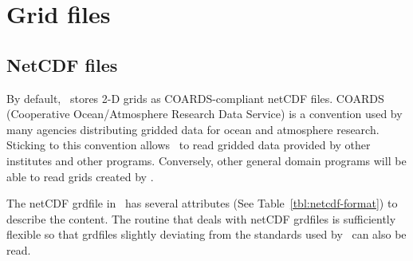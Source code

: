 \section{Grid files} 

\subsection{NetCDF files}

By default, \GMT\ stores 2-D grids as COARDS-compliant netCDF files.
COARDS (Cooperative Ocean/Atmosphere Research Data Service) is a convention used by
many agencies distributing gridded data for ocean and atmosphere research. Sticking to
this convention allows \GMT\ to read gridded data provided by other institutes
and other programs. Conversely, other general domain programs
will be able to read grids created by \GMT.

The netCDF grdfile in \GMT\ has several attributes (See Table~\ref{tbl:netcdf-format})
to describe the content. The routine
that deals with netCDF grdfiles is sufficiently flexible so that grdfiles slightly deviating
from the standards used by \GMT\ can also be read.

